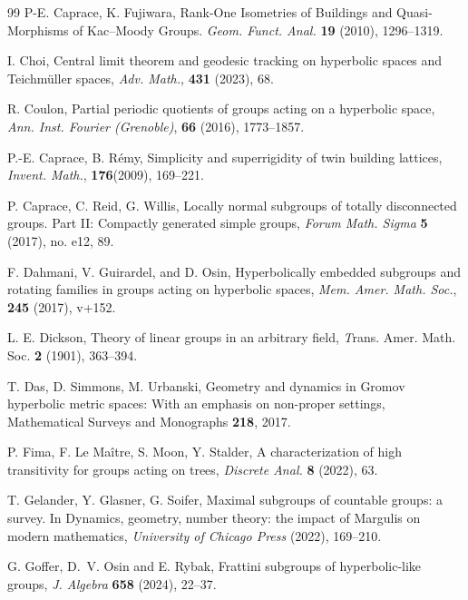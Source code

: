 \documentclass[11pt,letterpaper]{article}
\theoremstyle{definition}
\theoremstyle{remark}
\begin{document}
\begin{thebibliography}{99}
P-E. Caprace, K. Fujiwara, Rank-One Isometries of Buildings and Quasi-Morphisms of Kac–Moody Groups. \emph{Geom. Funct. Anal.} \textbf{19} (2010), 1296--1319.

I. Choi, Central limit theorem and geodesic tracking on hyperbolic spaces and Teichm\"uller spaces, \emph{Adv. Math.}, {\bf 431} (2023), 68.

R. Coulon, Partial periodic quotients of groups acting on a hyperbolic space, \emph{Ann. Inst. Fourier (Grenoble)}, {\bf 66} (2016), 1773--1857.

P.-E. Caprace, B. Rémy, Simplicity and superrigidity of twin building lattices, \emph{Invent. Math.}, \textbf{176}(2009), 169--221.

 P. Caprace, C. Reid, G. Willis, Locally normal subgroups of totally disconnected groups. Part II: Compactly generated simple groups, \emph{Forum Math. Sigma} \textbf{5} (2017), no. e12, 89.

F. Dahmani, V. Guirardel, and D. Osin, Hyperbolically embedded subgroups and rotating families in groups acting on hyperbolic spaces, \emph{Mem. Amer. Math. Soc.}, \textbf{245} (2017), v+152.

L. E. Dickson, Theory of linear groups in an arbitrary field, {\emph Trans. Amer. Math. Soc.} \textbf{2} (1901), 363--394.

T. Das, D. Simmons,  M. Urbanski, Geometry and dynamics in Gromov hyperbolic metric spaces: With an emphasis on non-proper settings, Mathematical Surveys and Monographs \textbf{218}, 2017.



P. Fima, F. Le Ma\^{i}tre, S. Moon, Y. Stalder, A characterization of high transitivity for groups acting on trees, \emph{Discrete Anal.} \textbf{8} (2022), 63.

T. Gelander, Y. Glasner, G. Soifer, Maximal subgroups of countable groups: a survey. In Dynamics, geometry, number theory: the impact of Margulis on modern mathematics, \emph{University of Chicago Press} (2022), 169--210.


G. Goffer, D.~V. Osin and E. Rybak, Frattini subgroups of hyperbolic-like groups, \emph{J. Algebra} {\bf 658} (2024), 22--37.


\end{thebibliography}
\end{document}
